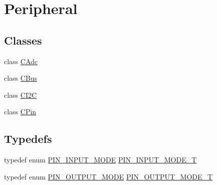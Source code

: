 \hypertarget{group___peripheral}{\section{Peripheral}
\label{group___peripheral}
}
\subsection*{Classes}
\begin{DoxyCompactItemize}
\item 
class \hyperlink{class_c_adc}{C\-Adc}
\item 
class \hyperlink{class_c_bus}{C\-Bus}
\item 
class \hyperlink{class_c_i2_c}{C\-I2\-C}
\item 
class \hyperlink{class_c_pin}{C\-Pin}
\end{DoxyCompactItemize}
\subsection*{Typedefs}
\begin{DoxyCompactItemize}
\item 
typedef enum \hyperlink{group___peripheral_ga16ce6180d8bb2eb23a7df8f8923ea581}{P\-I\-N\-\_\-\-I\-N\-P\-U\-T\-\_\-\-M\-O\-D\-E} \hyperlink{group___peripheral_gad5705547b72a4480dc714447b3bbfb64}{P\-I\-N\-\_\-\-I\-N\-P\-U\-T\-\_\-\-M\-O\-D\-E\-\_\-\-T}
\item 
typedef enum \hyperlink{group___peripheral_ga62483064e24f6949ab0a9b9234b4e549}{P\-I\-N\-\_\-\-O\-U\-T\-P\-U\-T\-\_\-\-M\-O\-D\-E} \hyperlink{group___peripheral_ga29412fef1d1b9fafc0cd270a5d702f28}{P\-I\-N\-\_\-\-O\-U\-T\-P\-U\-T\-\_\-\-M\-O\-D\-E\-\_\-\-T}
\end{DoxyCompactItemize}
